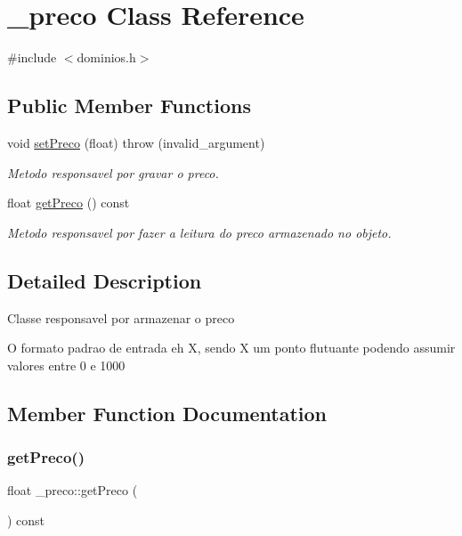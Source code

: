 \hypertarget{class__preco}{}\section{\+\_\+preco Class Reference}
\label{class__preco}


{\ttfamily \#include $<$dominios.\+h$>$}

\subsection*{Public Member Functions}
\begin{DoxyCompactItemize}
\item 
void \mbox{\hyperlink{class__preco_af32aa1aebf6b4a51e37fa833e02347ce}{set\+Preco}} (float)  throw (invalid\+\_\+argument)
\begin{DoxyCompactList}\small\item\em Metodo responsavel por gravar o preco. \end{DoxyCompactList}\item 
float \mbox{\hyperlink{class__preco_af57ed623da8985e6743074a42d0ddf52}{get\+Preco}} () const
\begin{DoxyCompactList}\small\item\em Metodo responsavel por fazer a leitura do preco armazenado no objeto. \end{DoxyCompactList}\end{DoxyCompactItemize}


\subsection{Detailed Description}
Classe responsavel por armazenar o preco

O formato padrao de entrada eh X, sendo X um ponto flutuante podendo assumir valores entre 0 e 1000 

\subsection{Member Function Documentation}
\mbox{\label{class__preco_af57ed623da8985e6743074a42d0ddf52}} 
\subsubsection{\texorpdfstring{getPreco()}{getPreco()}}
{\footnotesize\ttfamily float \+\_\+preco\+::get\+Preco (\begin{DoxyParamCaption}{ }\end{DoxyParamCaption}) const\hspace{0.3cm}{\ttfamily [inline]}}



